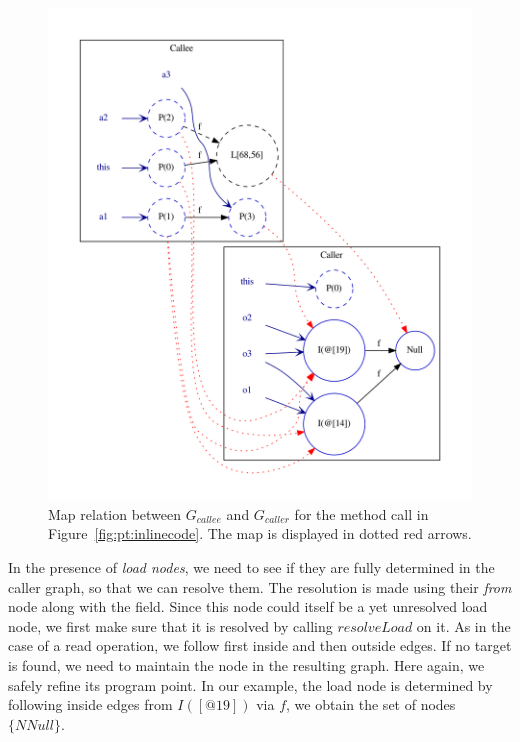 \begin{figure}
    \centering
    \includegraphics[scale=0.7]{images/pt_map1}
    \caption{Map relation between $G_{callee}$ and $G_{caller}$ for the method
call in Figure~\ref{fig:pt:inlinecode}.  The map is displayed in dotted red
arrows.}
    \label{fig:pt:map1}
\end{figure}

In the presence of \emph{load nodes}, we need to see if they are fully
determined in the caller graph, so that we can resolve them. The resolution is
made using their \emph{from} node along with the field. Since this node could
itself be a yet unresolved load node, we first make sure that it is resolved by
calling $resolveLoad$ on it. As in the case of a read operation, we follow
first inside and then outside edges. If no target is found, we need to maintain
the node in the resulting graph. Here again, we safely refine its program
point. In our example, the load node is determined by following inside edges
from $I([@19])$ via $f$, we obtain the set of nodes $\{ NNull \}$.

